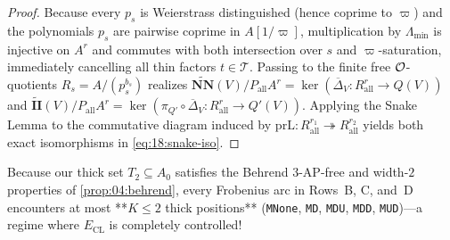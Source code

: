\begin{proof}
Because every $p_s$ is Weierstrass distinguished (hence coprime to $\varpi$) and the polynomials $p_s$ are pairwise coprime in $A[1/\varpi]$, multiplication by $\Lambda_{\min}$ is injective on $A^r$ and commutes with both intersection over $s$ and $\varpi$-saturation, immediately cancelling all thin factors $t \in \mathcal{T}$. Passing to the finite free $\mathcal{O}$-quotients $R_s = A/(p_s^{b_s})$ realizes $\widetilde{\mathbf{NN}}(V)/P_{\mathrm{all}} A^r = \ker(\overline{\Delta}_V : R_{\mathrm{all}}^r \to Q(V))$ and $\widetilde{\mathbf{II}}(V)/P_{\mathrm{all}} A^r = \ker(\pi_{Q'} \circ \overline{\Delta}_V : R_{\mathrm{all}}^r \to Q'(V))$. Applying the Snake Lemma to the commutative diagram induced by $\mathrm{prL} : R_{\mathrm{all}}^{r_1} \twoheadrightarrow R_{\mathrm{all}}^{r_2}$ yields both exact isomorphisms in \eqref{eq:18:snake-iso}.
\end{proof}

Because our thick set $T_2 \subseteq A_0$ satisfies the Behrend $3$-AP-free and width-$2$ properties of \cref{prop:04:behrend}, every Frobenius arc in Rows~B, C, and~D encounters at most **$K \le 2$ thick positions** (\texttt{MNone}, \texttt{MD}, \texttt{MDU}, \texttt{MDD}, \texttt{MUD})—a regime where $E_{\mathrm{CL}}$ is completely controlled!

